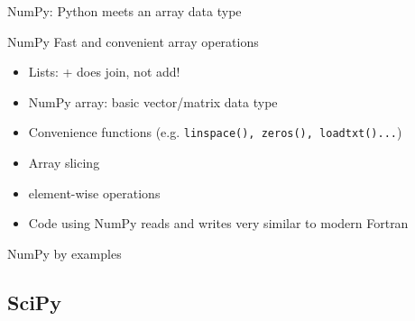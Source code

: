 \begin{frame}{NumPy: Python meets an array data type}

\begin{exbox}{NumPy}
Fast and convenient array operations
\end{exbox}

\begin{itemize}
	\item Lists: + does join, not add!
	\item NumPy array: basic vector/matrix data type
	\item Convenience functions (e.g. {\texttt{linspace(), zeros(), loadtxt()...}})
	\item Array slicing
	\item element-wise operations
	\item Code using NumPy reads and writes very similar to modern Fortran
\end{itemize}

\end{frame}

\begin{frame}[fragile]{NumPy by examples}



\end{frame}

\subsection{SciPy}

